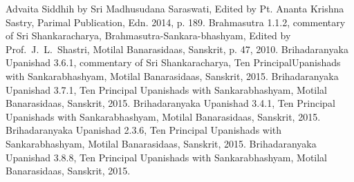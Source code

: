 \documentclass[twoside, 13pt]{article}
\begin{document}
{{{\begin{thebibliography}{99}
\bibitem{} Advaita Siddhih by Sri Madhusudana Saraswati, Edited by Pt. Ananta Krishna Sastry, Parimal Publication, Edn. 2014, p. 189.
\bibitem{} Brahmasutra 1.1.2, commentary of Sri Shankaracharya, Brahmasutra-Sankara-\break bhashyam, Edited by Prof.~J.~L.~Shastri, Motilal Banarasidaas, Sanskrit, p. 47, 2010.
\bibitem{} Brihadaranyaka Upanishad 3.6.1, commentary of Sri Shankaracharya, Ten Principal\break Upanishads with Sankarabhashyam, Motilal Banarasidaas, Sanskrit, 2015.
\bibitem{} Brihadaranyaka Upanishad 3.7.1, Ten Principal Upanishads with Sankarabhashyam, Motilal Banarasidaas, Sanskrit, 2015.
\bibitem{} Brihadaranyaka Upanishad 3.4.1, Ten Principal Upanishads with Sankarabhashyam, Motilal Banarasidaas, Sanskrit, 2015.
\bibitem{} Brihadaranyaka Upanishad 2.3.6, Ten Principal Upanishads with Sankarabhashyam, Motilal Banarasidaas, Sanskrit, 2015.
\bibitem{} Brihadaranyaka Upanishad 3.8.8, Ten Principal Upanishads with Sankarabhashyam, Motilal Banarasidaas, Sanskrit, 2015.


\end{thebibliography}}}}
\end{document}
